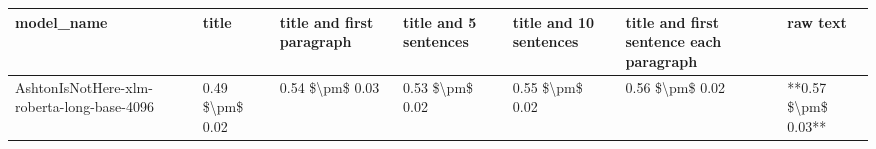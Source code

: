 \begin{tabular}{lllllll}
\toprule
                                model\_name &           title & title and first paragraph & title and 5 sentences & title and 10 sentences & title and first sentence each paragraph &            raw text \\
\midrule
AshtonIsNotHere-xlm-roberta-long-base-4096 & 0.49 \$\textbackslash pm\$ 0.02 &           0.54 \$\textbackslash pm\$ 0.03 &       0.53 \$\textbackslash pm\$ 0.02 &        0.55 \$\textbackslash pm\$ 0.02 &                         0.56 \$\textbackslash pm\$ 0.02 & **0.57 \$\textbackslash pm\$ 0.03** \\
\bottomrule
\end{tabular}
